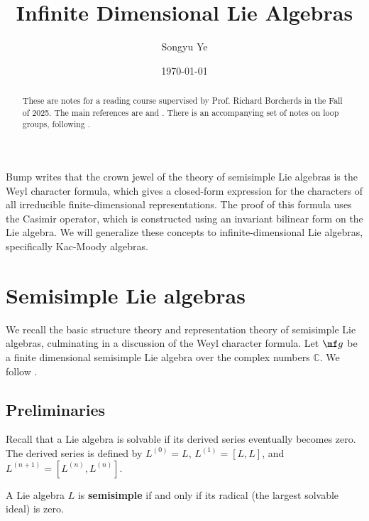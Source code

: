 \documentclass[12pt]{article}
\begin{document}
\rhead{\today}
\cfoot{\thepage}

\title{Infinite Dimensional Lie Algebras}

\author{Songyu Ye}
\date{\today}
\maketitle


\begin{abstract}
    These are notes for a reading course supervised by Prof. Richard Borcherds in the Fall of 2025. The main references are \cite{kac} and \cite{frenkel-ben-zvi}. There is an accompanying set of notes on loop groups, following \cite{pressley-segal}.
\end{abstract}

\tableofcontents

Bump \cite{bump} writes that the crown jewel of the theory of semisimple Lie algebras is the Weyl character formula, which gives a closed-form expression for the characters of all irreducible finite-dimensional representations. The proof of this formula uses the Casimir operator, which is constructed using an invariant bilinear form on the Lie algebra. We will generalize these concepts to infinite-dimensional Lie algebras, specifically Kac-Moody algebras.
\section{Semisimple Lie algebras}
We recall the basic structure theory and representation theory of semisimple Lie algebras, culminating in a discussion of the Weyl character formula. Let $\mf g$ be a finite dimensional semisimple Lie algebra over the complex numbers $\mathbb{C}$. We follow \cite{bump}.
\subsection{Preliminaries}
\begin{definition}
    Recall that a Lie algebra is solvable if its derived series eventually becomes zero. The derived series is defined by $L^{(0)} = L$, $L^{(1)} = [L,L]$, and $L^{(n+1)} = [L^{(n)}, L^{(n)}]$.
\end{definition}

\begin{definition}
    A Lie algebra $L$ is \textbf{semisimple} if and only if its radical (the largest solvable ideal) is zero.
\end{definition}
\end{document}
